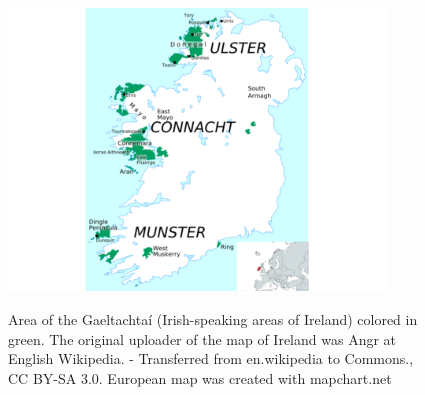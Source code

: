 \documentclass[thesis]{cluu}
\begin{document}
\begin{figure}[h]
    \includegraphics[width=10cm]{Gaeltachtai_with_europe_highlight_centered.png}
    \centering
    \label{fig:gaeltacht}
    \caption{Area of the Gaeltachtaí (Irish-speaking areas of Ireland) colored in green. The original uploader of the map of Ireland was Angr at English Wikipedia. - Transferred from en.wikipedia to Commons., CC BY-SA 3.0. European map was created with mapchart.net}
\end{figure} 
\end{document}

